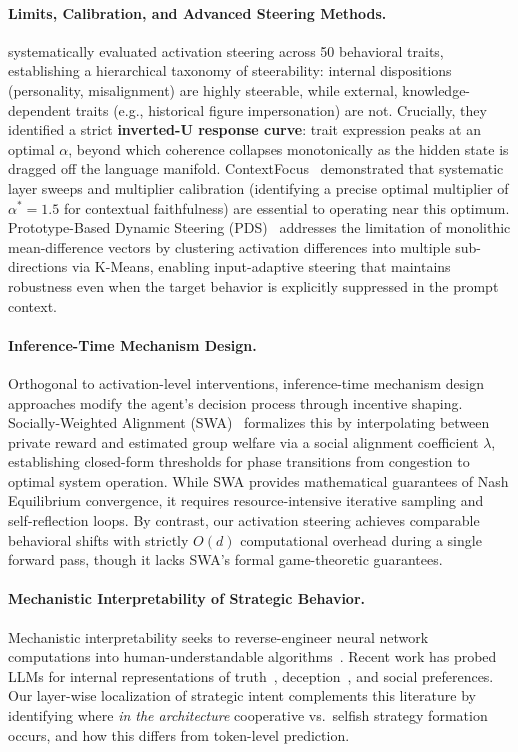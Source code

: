 \documentclass{article}
\begin{document}
\paragraph{Limits, Calibration, and Advanced Steering Methods.}
\citet{bas2025steer} systematically evaluated activation steering across 50 behavioral traits, establishing a hierarchical taxonomy of steerability: internal dispositions (personality, misalignment) are highly steerable, while external, knowledge-dependent traits (e.g., historical figure impersonation) are not. Crucially, they identified a strict \textbf{inverted-U response curve}: trait expression peaks at an optimal $\alpha$, beyond which coherence collapses monotonically as the hidden state is dragged off the language manifold. ContextFocus~\citep{anand2026contextfocus} demonstrated that systematic layer sweeps and multiplier calibration (identifying a precise optimal multiplier of $\alpha^* = 1.5$ for contextual faithfulness) are essential to operating near this optimum. Prototype-Based Dynamic Steering (PDS)~\citep{kayan2025pds} addresses the limitation of monolithic mean-difference vectors by clustering activation differences into multiple sub-directions via K-Means, enabling input-adaptive steering that maintains robustness even when the target behavior is explicitly suppressed in the prompt context.

\paragraph{Inference-Time Mechanism Design.}
Orthogonal to activation-level interventions, inference-time mechanism design approaches modify the agent's decision process through incentive shaping. Socially-Weighted Alignment (SWA)~\citep{mumcu2026swa} formalizes this by interpolating between private reward and estimated group welfare via a social alignment coefficient $\lambda$, establishing closed-form thresholds for phase transitions from congestion to optimal system operation. While SWA provides mathematical guarantees of Nash Equilibrium convergence, it requires resource-intensive iterative sampling and self-reflection loops. By contrast, our activation steering achieves comparable behavioral shifts with strictly $O(d)$ computational overhead during a single forward pass, though it lacks SWA's formal game-theoretic guarantees.

\paragraph{Mechanistic Interpretability of Strategic Behavior.}
Mechanistic interpretability seeks to reverse-engineer neural network computations into human-understandable algorithms~\citep{olah2020zoom, elhage2022toy}. Recent work has probed LLMs for internal representations of truth~\citep{li2024inference}, deception~\citep{azaria2023internal}, and social preferences. Our layer-wise localization of strategic intent complements this literature by identifying where \textit{in the architecture} cooperative vs.\ selfish strategy formation occurs, and how this differs from token-level prediction.
\end{document}
